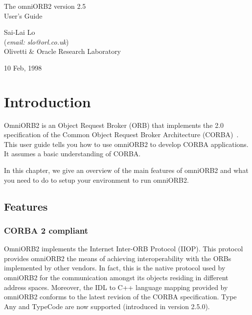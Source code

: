\documentclass[11pt,twoside,onecolumn]{book}
\begin{document}
\pagestyle{empty}


\begin{center}

\vfill

{ \Huge
The omniORB2 version 2.5\\[4mm]
User's Guide
}

\vfill

{ \Large
Sai-Lai Lo\\
{\normalsize ({\it email: slo@orl.co.uk})}\\
Olivetti \& Oracle Research Laboratory\\
}


\vfill
\vfill
10 Feb, 1998
\vfill

\end{center}
\cleardoublepage
\tableofcontents
\cleardoublepage
\pagestyle{headings}


\mainmatter

%
\chapter{Introduction}

OmniORB2 is an Object Request Broker (ORB) that implements the 2.0
specification of the Common Object Request Broker Architecture (CORBA)~\cite{corba2-spec}.
This user guide tells you how to use omniORB2 to develop CORBA applications.
It assumes a basic understanding of CORBA. 

In this chapter, we give an overview of the main features of omniORB2 and
what you need to do to setup your environment to run omniORB2.

\section{Features}

\subsection{CORBA 2 compliant}

OmniORB2 implements the Internet Inter-ORB Protocol (IIOP).
This protocol provides omniORB2 the means of achieving interoperability
with the ORBs implemented by other vendors. In fact, this is the
native protocol used by omniORB2 for the communication amongst its objects
residing in different address spaces. Moreover, the IDL to C++ language
mapping provided by omniORB2 conforms to the latest revision of the CORBA
specification. Type Any and TypeCode are now supported (introduced in version
2.5.0).
\end{document}
